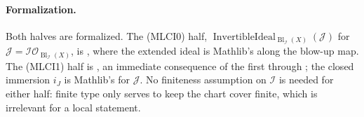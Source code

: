 \begin{theorem}
  \paragraph{Formalization.}
  Both halves are formalized.  The (MLCI0) half,
  $\operatorname{InvertibleIdeal}_{\operatorname{Bl}_{\mathcal I}(X)}(\mathcal J)$ for
  $\mathcal J=\mathcal I\mathcal O_{\operatorname{Bl}_{\mathcal I}(X)}$, is
  \texttt{}, where the extended ideal is
  Mathlib's \texttt{} along the blow-up map.
  The (MLCI1) half is
  \texttt{}, an
  immediate consequence of the first through
  \texttt{}; the closed immersion
  $i_J$ is Mathlib's \texttt{} for
  $\mathcal J$.  No finiteness assumption on $\mathcal I$ is needed for either half:
  finite type only serves to keep the chart cover finite, which is irrelevant for a
  local statement.
\end{theorem}

